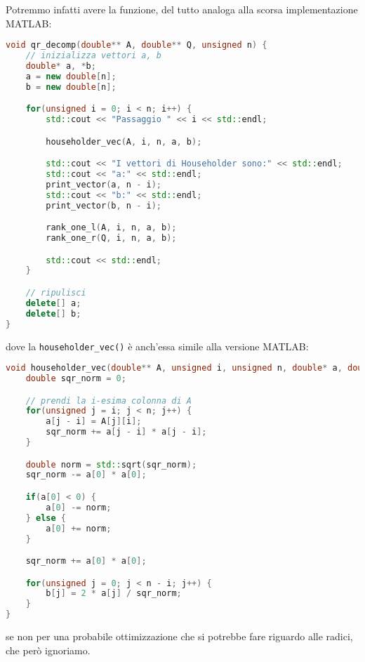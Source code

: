 \documentclass[a4paper,11pt]{article}
\begin{document}
Potremmo infatti avere la funzione, del tutto analoga alla scorsa implementazione MATLAB:
\begin{lstlisting}[language=C++, style=codestyle]	
void qr_decomp(double** A, double** Q, unsigned n) {
	// inizializza vettori a, b
	double* a, *b;
	a = new double[n];
	b = new double[n];

	for(unsigned i = 0; i < n; i++) {
		std::cout << "Passaggio " << i << std::endl;

		householder_vec(A, i, n, a, b);

		std::cout << "I vettori di Householder sono:" << std::endl;
		std::cout << "a:" << std::endl;
		print_vector(a, n - i);
		std::cout << "b:" << std::endl;
		print_vector(b, n - i);

		rank_one_l(A, i, n, a, b);
		rank_one_r(Q, i, n, a, b);

		std::cout << std::endl;
	}

	// ripulisci
	delete[] a;
	delete[] b;
}
\end{lstlisting}
dove la \lstinline|householder_vec()| è anch'essa simile alla versione MATLAB:
\begin{lstlisting}[language=C++, style=codestyle]	
void householder_vec(double** A, unsigned i, unsigned n, double* a, double* b) {
	double sqr_norm = 0;

	// prendi la i-esima colonna di A
	for(unsigned j = i; j < n; j++) {
		a[j - i] = A[j][i];
		sqr_norm += a[j - i] * a[j - i];
	}

	double norm = std::sqrt(sqr_norm);
	sqr_norm -= a[0] * a[0];

	if(a[0] < 0) {
		a[0] -= norm;
	} else {
		a[0] += norm;
	}

	sqr_norm += a[0] * a[0];

	for(unsigned j = 0; j < n - i; j++) {
		b[j] = 2 * a[j] / sqr_norm;
	}
}
\end{lstlisting}
se non per una probabile ottimizzazione che si potrebbe fare riguardo alle radici, che però ignoriamo.
\end{document}

